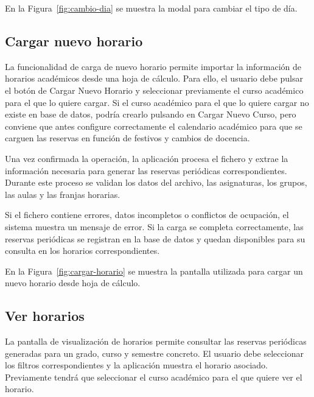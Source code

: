 
En la Figura~\ref{fig:cambio-dia} se muestra la modal para cambiar el tipo de día.


\subsection{Cargar nuevo horario}

La funcionalidad de carga de nuevo horario permite importar la información de horarios académicos desde una hoja de cálculo. Para ello, el usuario debe pulsar el botón de Cargar Nuevo Horario y seleccionar previamente el curso académico para el que lo quiere cargar.
Si el curso académico para el que lo quiere cargar no existe en base de datos, podría crearlo pulsando en Cargar Nuevo Curso, pero conviene que antes configure correctamente el calendario académico para que se carguen las reservas en función de festivos y cambios de docencia.

Una vez confirmada la operación, la aplicación procesa el fichero y extrae la información necesaria para generar las reservas periódicas correspondientes. Durante este proceso se validan los datos del archivo, las asignaturas, los grupos, las aulas y las franjas horarias.

Si el fichero contiene errores, datos incompletos o conflictos de ocupación, el sistema muestra un mensaje de error. Si la carga se completa correctamente, las reservas periódicas se registran en la base de datos y quedan disponibles para su consulta en los horarios correspondientes.

En la Figura~\ref{fig:cargar-horario} se muestra la pantalla utilizada para cargar un nuevo horario desde hoja de cálculo.



\subsection{Ver horarios}

La pantalla de visualización de horarios permite consultar las reservas periódicas generadas para un grado, curso y semestre concreto. El usuario debe seleccionar los filtros correspondientes y la aplicación muestra el horario asociado. Previamente tendrá que seleccionar el curso académico para el que quiere ver el horario.

